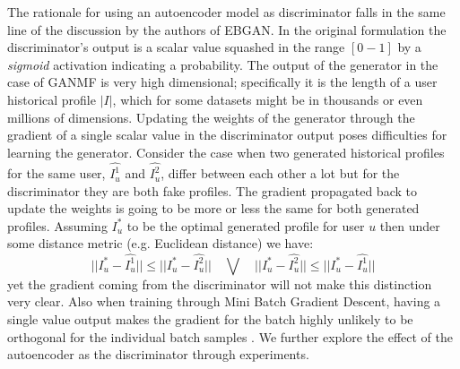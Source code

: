 The rationale for using an autoencoder model as discriminator falls in the same line of the discussion by the authors of EBGAN. In the original formulation the discriminator's output is a scalar value squashed in the range $[0-1]$ by a \emph{sigmoid} activation indicating a probability. The output of the generator in the case of GANMF is very high dimensional; specifically it is the length of a user historical profile $|I|$, which for some datasets might be in thousands or even millions of dimensions. Updating the weights of the generator through the gradient of a single scalar value in the discriminator output poses difficulties for learning the generator. Consider the case when two generated historical profiles for the same user, $\hat{I^1_{u}}$ and $\hat{I^2_{u}}$, differ between each other a lot but for the discriminator they are both fake profiles. The gradient propagated back to update the weights is going to be more or less the same for both generated profiles. Assuming $I^*_{u}$ to be the optimal generated profile for user $u$ then under some distance metric (e.g. Euclidean distance) we have:
\[
||I^*_{u} - \hat{I^1_{u}}|| \leq  ||I^*_{u} - \hat{I^2_{u}}||\quad \bigvee \quad
||I^*_{u} - \hat{I^2_{u}}|| \leq  ||I^*_{u} - \hat{I^1_{u}}||
\]
yet the gradient coming from the discriminator will not make this distinction very clear. Also when training through Mini Batch Gradient Descent, having a single value output makes the gradient for the batch highly unlikely to be orthogonal for the individual batch samples \cite{zhao2016energy}. We further explore the effect of the autoencoder as the discriminator through experiments.

